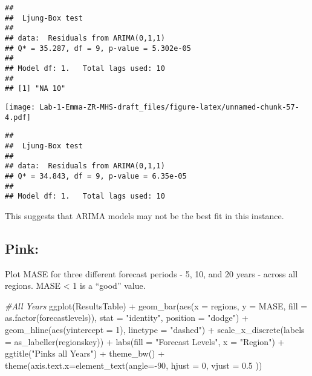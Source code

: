 \documentclass[
]{article}
\newenvironment{Shaded}{\begin{snugshade}}{\end{snugshade}}
\newcommand{\AttributeTok}[1]{\textcolor[rgb]{0.77,0.63,0.00}{#1}}
\newcommand{\CommentTok}[1]{\textcolor[rgb]{0.56,0.35,0.01}{\textit{#1}}}
\newcommand{\DecValTok}[1]{\textcolor[rgb]{0.00,0.00,0.81}{#1}}
\newcommand{\FloatTok}[1]{\textcolor[rgb]{0.00,0.00,0.81}{#1}}
\newcommand{\FunctionTok}[1]{\textcolor[rgb]{0.00,0.00,0.00}{#1}}
\newcommand{\NormalTok}[1]{#1}
\newcommand{\SpecialCharTok}[1]{\textcolor[rgb]{0.00,0.00,0.00}{#1}}
\newcommand{\StringTok}[1]{\textcolor[rgb]{0.31,0.60,0.02}{#1}}
\begin{document}
\begin{verbatim}
## 
##  Ljung-Box test
## 
## data:  Residuals from ARIMA(0,1,1)
## Q* = 35.287, df = 9, p-value = 5.302e-05
## 
## Model df: 1.   Total lags used: 10
## 
## [1] "NA 10"
\end{verbatim}

\texttt{[image: Lab-1-Emma-ZR-MHS-draft\_files/figure-latex/unnamed-chunk-57-4.pdf]}

\begin{verbatim}
## 
##  Ljung-Box test
## 
## data:  Residuals from ARIMA(0,1,1)
## Q* = 34.843, df = 9, p-value = 6.35e-05
## 
## Model df: 1.   Total lags used: 10
\end{verbatim}

This suggests that ARIMA models may not be the best fit in this
instance.

\hypertarget{pink}{%
\subsection{Pink:}\label{pink}}

Plot MASE for three different forecast periods - 5, 10, and 20 years -
across all regions. MASE \textless{} 1 is a ``good'' value.

\begin{Shaded}
\begin{Highlighting}[]
\CommentTok{\#All Years}
\FunctionTok{ggplot}\NormalTok{(ResultsTable) }\SpecialCharTok{+} 
  \FunctionTok{geom\_bar}\NormalTok{(}\FunctionTok{aes}\NormalTok{(}\AttributeTok{x =}\NormalTok{ regions, }\AttributeTok{y =}\NormalTok{ MASE, }\AttributeTok{fill =} \FunctionTok{as.factor}\NormalTok{(forecastlevels)), }\AttributeTok{stat =} \StringTok{"identity"}\NormalTok{, }\AttributeTok{position =} \StringTok{"dodge"}\NormalTok{) }\SpecialCharTok{+} 
  \FunctionTok{geom\_hline}\NormalTok{(}\FunctionTok{aes}\NormalTok{(}\AttributeTok{yintercept =} \DecValTok{1}\NormalTok{), }\AttributeTok{linetype =} \StringTok{"dashed"}\NormalTok{) }\SpecialCharTok{+} 
  \FunctionTok{scale\_x\_discrete}\NormalTok{(}\AttributeTok{labels =} \FunctionTok{as\_labeller}\NormalTok{(regionskey)) }\SpecialCharTok{+}
  \FunctionTok{labs}\NormalTok{(}\AttributeTok{fill =} \StringTok{"Forecast Levels"}\NormalTok{, }\AttributeTok{x =} \StringTok{"Region"}\NormalTok{) }\SpecialCharTok{+} 
  \FunctionTok{ggtitle}\NormalTok{(}\StringTok{"Pinks all Years"}\NormalTok{) }\SpecialCharTok{+} \FunctionTok{theme\_bw}\NormalTok{() }\SpecialCharTok{+} \FunctionTok{theme}\NormalTok{(}\AttributeTok{axis.text.x=}\FunctionTok{element\_text}\NormalTok{(}\AttributeTok{angle=}\SpecialCharTok{{-}}\DecValTok{90}\NormalTok{, }\AttributeTok{hjust =} \DecValTok{0}\NormalTok{, }\AttributeTok{vjust =} \FloatTok{0.5}\NormalTok{ ))}
\end{Highlighting}
\end{Shaded}
\end{document}
